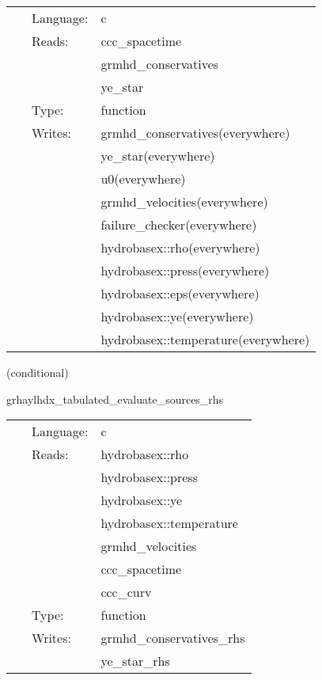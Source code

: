 \documentclass{article}
\begin{document}
\hspace{5mm}

 \begin{tabular*}{160mm}{cll} 
~ & Language:  & c \\ 
~ & Reads:  & ccc\_spacetime \\ 
~& ~ &grmhd\_conservatives\\ 
~& ~ &ye\_star\\ 
~ & Type:  & function \\ 
~ & Writes:  & grmhd\_conservatives(everywhere) \\ 
~& ~ &ye\_star(everywhere)\\ 
~& ~ &u0(everywhere)\\ 
~& ~ &grmhd\_velocities(everywhere)\\ 
~& ~ &failure\_checker(everywhere)\\ 
~& ~ &hydrobasex::rho(everywhere)\\ 
~& ~ &hydrobasex::press(everywhere)\\ 
~& ~ &hydrobasex::eps(everywhere)\\ 
~& ~ &hydrobasex::ye(everywhere)\\ 
~& ~ &hydrobasex::temperature(everywhere)\\ 
\end{tabular*} 


\vspace{5mm}

   (conditional) 

\hspace{5mm} grhaylhdx\_tabulated\_evaluate\_sources\_rhs 

\hspace{5mm}{\it tabulated version of grhaylhdx\_evaluate\_sources\_rhs } 


\hspace{5mm}

 \begin{tabular*}{160mm}{cll} 
~ & Language:  & c \\ 
~ & Reads:  & hydrobasex::rho \\ 
~& ~ &hydrobasex::press\\ 
~& ~ &hydrobasex::ye\\ 
~& ~ &hydrobasex::temperature\\ 
~& ~ &grmhd\_velocities\\ 
~& ~ &ccc\_spacetime\\ 
~& ~ &ccc\_curv\\ 
~ & Type:  & function \\ 
~ & Writes:  & grmhd\_conservatives\_rhs \\ 
~& ~ &ye\_star\_rhs\\ 
\end{tabular*} 
\end{document}
